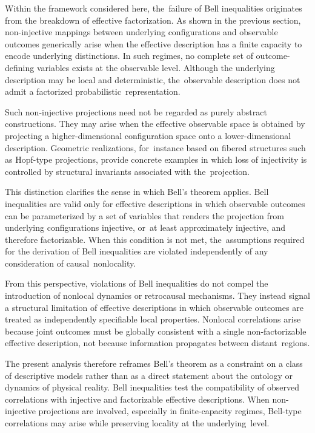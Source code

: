 \documentclass[quantumrep,article,accept,pdftex,oneauthor]{Definitions/mdpi}
\theoremstyle{remark}
\begin{document}
  Within the framework considered here, the~failure of Bell inequalities originates
  from the breakdown of effective factorization.
  As shown in the previous section, non-injective mappings between underlying
  configurations and observable outcomes generically arise when the effective
  description has a finite capacity to encode underlying distinctions.
  In such regimes, no complete set of outcome-defining variables exists at the
  observable level.
  Although the underlying description may be local and deterministic, the~observable
  description does not admit a factorized probabilistic~representation.

  Such non-injective projections need not be regarded as purely abstract constructions.
  They may arise when the effective observable space is obtained by projecting a
  higher-dimensional configuration space onto a lower-dimensional description.
  Geometric realizations, for~instance based on fibered structures such as Hopf-type
  projections, provide concrete examples in which loss of injectivity is controlled
  by structural invariants associated with the~projection.

  This distinction clarifies the sense in which Bell’s theorem applies.
  Bell inequalities are valid only for effective descriptions in which observable
  outcomes can be parameterized by a set of variables that renders the projection from
  underlying configurations injective, or~at least approximately injective, and therefore factorizable.
  When this condition is not met, the~assumptions required for the derivation of Bell
  inequalities are violated independently of any consideration of causal~nonlocality.

  From this perspective, violations of Bell inequalities do not compel the introduction
  of nonlocal dynamics or retrocausal mechanisms.
  They instead signal a structural limitation of effective descriptions in which
  observable outcomes are treated as independently specifiable local properties.
  Nonlocal correlations arise because joint outcomes must be globally consistent with a
  single non-factorizable effective description, not because information propagates
  between distant~regions.

  The present analysis therefore reframes Bell’s theorem as a constraint on a class of
  descriptive models rather than as a direct statement about the ontology or dynamics of physical reality.
  Bell inequalities test the compatibility of observed correlations with injective and
  factorizable effective descriptions.
  When non-injective projections are involved, especially in finite-capacity regimes,
  Bell-type correlations may arise while preserving locality at the underlying~level.
\end{document}
